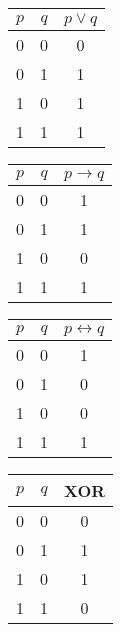 \begin{multicols}{2}
\begin{multicols}{2}
        \begin{table}[H]
            \begin{tabular}{cc|c}
                $p$ & $q$ & $p \vee q$ \\ \hline
                0   & 0   & 0          \\
                0   & 1   & 1          \\
                1   & 0   & 1          \\
                1   & 1   & 1
            \end{tabular}
        \end{table}
    
        \begin{table}[H]
            \begin{tabular}{cc|c}
                $p$ & $q$ & $p \rightarrow q$ \\ \hline
                0   & 0   & 1                 \\
                0   & 1   & 1                 \\
                1   & 0   & 0                 \\
                1   & 1   & 1
            \end{tabular}
        \end{table}
    
        \begin{table}[H]
            \begin{tabular}{cc|c}
                $p$ & $q$ & $p \leftrightarrow q$ \\ \hline
                0   & 0   & 1                     \\
                0   & 1   & 0                     \\
                1   & 0   & 0                     \\
                1   & 1   & 1
            \end{tabular}
        \end{table}
    
        \begin{table}[H]
            \begin{tabular}{cc|c}
                $p$ & $q$ & XOR \\ \hline
                0   & 0   & 0   \\
                0   & 1   & 1   \\
                1   & 0   & 1   \\
                1   & 1   & 0
            \end{tabular}
        \end{table}
    \end{multicols}
    

\end{multicols}
